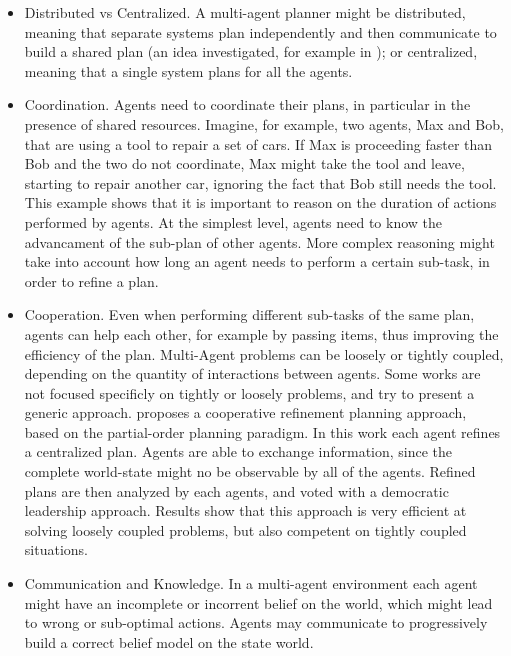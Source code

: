 \begin{itemize}
\item Distributed vs Centralized. A multi-agent planner might be distributed, meaning that separate systems plan independently and then communicate to build a shared plan (an idea investigated, for example in \cite{nikolaidis2013cross,guestrin2002distributed} ); or centralized, meaning that a single system plans for all the agents.
\item Coordination. Agents need to coordinate their plans, in particular in the presence of shared resources. Imagine, for example, two agents, Max and Bob, that are using a tool to repair a set of cars. If Max is proceeding faster than Bob and the two do not coordinate, Max might take the tool and leave, starting to repair another car, ignoring the fact that Bob still needs the tool. This example shows that it is important to reason on the duration of actions performed by agents. At the simplest level, agents need to know the advancament of the sub-plan of other agents. More complex reasoning might take into account how long an agent needs to perform a certain sub-task, in order to refine a plan. 
\item Cooperation. Even when performing different sub-tasks of the same plan, agents can help each other, for example by passing items, thus improving the efficiency of the plan. Multi-Agent problems can be loosely or tightly coupled, depending on the quantity of interactions between agents. Some works are not focused specificly on tightly or loosely problems, and try to present a generic approach. \cite{torreno2015approach} proposes a cooperative refinement planning approach, based on the partial-order planning paradigm. In this work each agent refines a centralized plan. Agents are able to exchange information, since the complete world-state might no be observable by all of the agents. Refined plans are then analyzed by each agents, and voted with a democratic leadership approach. Results show that this approach is very efficient at solving loosely coupled problems, but also competent on tightly coupled situations. 

\item Communication and Knowledge. In a multi-agent environment each agent might have an incomplete or incorrent belief on the world, which might lead to wrong or sub-optimal actions. Agents may communicate to progressively build a correct belief model on the state world. 
\end{itemize}

